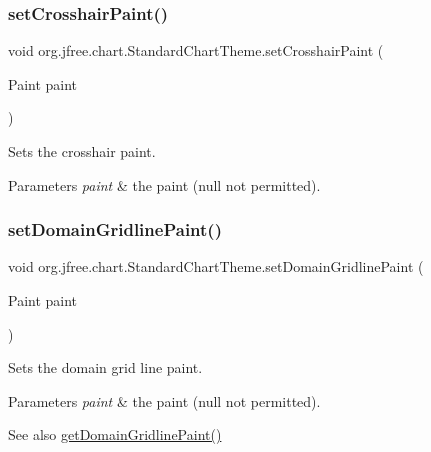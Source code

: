 \subsubsection{\texorpdfstring{set\+Crosshair\+Paint()}{setCrosshairPaint()}}
{\footnotesize\ttfamily void org.\+jfree.\+chart.\+Standard\+Chart\+Theme.\+set\+Crosshair\+Paint (\begin{DoxyParamCaption}\item[{Paint}]{paint }\end{DoxyParamCaption})}

Sets the crosshair paint.


\begin{DoxyParams}{Parameters}
{\em paint} & the paint ({\ttfamily null} not permitted). \\
\hline
\end{DoxyParams}
\mbox{\label{classorg_1_1jfree_1_1chart_1_1_standard_chart_theme_a4dbda23eca8a76a55f4db9732e2b8957}} 
\subsubsection{\texorpdfstring{set\+Domain\+Gridline\+Paint()}{setDomainGridlinePaint()}}
{\footnotesize\ttfamily void org.\+jfree.\+chart.\+Standard\+Chart\+Theme.\+set\+Domain\+Gridline\+Paint (\begin{DoxyParamCaption}\item[{Paint}]{paint }\end{DoxyParamCaption})}

Sets the domain grid line paint.


\begin{DoxyParams}{Parameters}
{\em paint} & the paint ({\ttfamily null} not permitted).\\
\hline
\end{DoxyParams}
\begin{DoxySeeAlso}{See also}
\mbox{\hyperlink{classorg_1_1jfree_1_1chart_1_1_standard_chart_theme_a5061819d22f9e7d6f091160fd276396e}{get\+Domain\+Gridline\+Paint()}} 
\end{DoxySeeAlso}
\mbox{\label{classorg_1_1jfree_1_1chart_1_1_standard_chart_theme_a0ba32a6320e8d58ec22edfc7e024f811}} 
